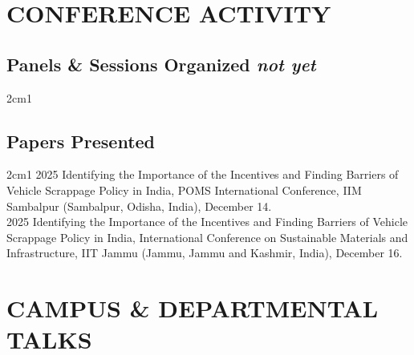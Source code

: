 \documentclass[final, 12pt]{article}
\begin{document}
\section*{CONFERENCE ACTIVITY}

\subsection*{Panels \& Sessions Organized \it not yet}

\begin{hangparas}{2cm}{1}
\end{hangparas}

\subsection*{Papers Presented}

\begin{hangparas}{2cm}{1}
2025 \tabto{2cm} Identifying the Importance of the Incentives and Finding Barriers of Vehicle Scrappage Policy in India, POMS International Conference, IIM Sambalpur (Sambalpur, Odisha, India), December 14. \\

2025 \tabto{2cm} Identifying the Importance of the Incentives and Finding Barriers of Vehicle Scrappage Policy in India, International Conference on Sustainable Materials and Infrastructure, IIT Jammu (Jammu, Jammu and Kashmir, India), December 16. \\

\end{hangparas}


\section*{CAMPUS \& DEPARTMENTAL TALKS}
\end{document}
